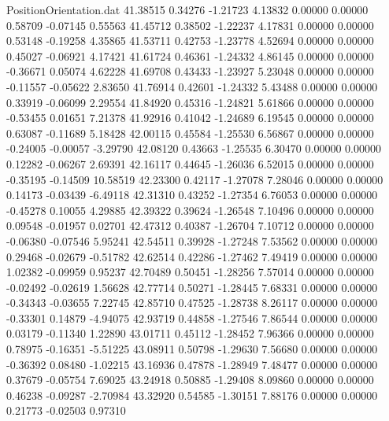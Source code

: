 \begin{filecontents}{PositionOrientation.dat}
  41.38515    0.34276   -1.21723     4.13832    0.00000    0.00000    0.58709   -0.07145    0.55563
  41.45712    0.38502   -1.22237     4.17831    0.00000    0.00000    0.53148   -0.19258    4.35865
  41.53711    0.42753   -1.23778     4.52694    0.00000    0.00000    0.45027   -0.06921    4.17421
  41.61724    0.46361   -1.24332     4.86145    0.00000    0.00000   -0.36671    0.05074    4.62228
  41.69708    0.43433   -1.23927     5.23048    0.00000    0.00000   -0.11557   -0.05622    2.83650
  41.76914    0.42601   -1.24332     5.43488    0.00000    0.00000    0.33919   -0.06099    2.29554
  41.84920    0.45316   -1.24821     5.61866    0.00000    0.00000   -0.53455    0.01651    7.21378
  41.92916    0.41042   -1.24689     6.19545    0.00000    0.00000    0.63087   -0.11689    5.18428
  42.00115    0.45584   -1.25530     6.56867    0.00000    0.00000   -0.24005   -0.00057   -3.29790
  42.08120    0.43663   -1.25535     6.30470    0.00000    0.00000    0.12282   -0.06267    2.69391
  42.16117    0.44645   -1.26036     6.52015    0.00000    0.00000   -0.35195   -0.14509   10.58519
  42.23300    0.42117   -1.27078     7.28046    0.00000    0.00000    0.14173   -0.03439   -6.49118
  42.31310    0.43252   -1.27354     6.76053    0.00000    0.00000   -0.45278    0.10055    4.29885
  42.39322    0.39624   -1.26548     7.10496    0.00000    0.00000    0.09548   -0.01957    0.02701
  42.47312    0.40387   -1.26704     7.10712    0.00000    0.00000   -0.06380   -0.07546    5.95241
  42.54511    0.39928   -1.27248     7.53562    0.00000    0.00000    0.29468   -0.02679   -0.51782
  42.62514    0.42286   -1.27462     7.49419    0.00000    0.00000    1.02382   -0.09959    0.95237
  42.70489    0.50451   -1.28256     7.57014    0.00000    0.00000   -0.02492   -0.02619    1.56628
  42.77714    0.50271   -1.28445     7.68331    0.00000    0.00000   -0.34343   -0.03655    7.22745
  42.85710    0.47525   -1.28738     8.26117    0.00000    0.00000   -0.33301    0.14879   -4.94075
  42.93719    0.44858   -1.27546     7.86544    0.00000    0.00000    0.03179   -0.11340    1.22890
  43.01711    0.45112   -1.28452     7.96366    0.00000    0.00000    0.78975   -0.16351   -5.51225
  43.08911    0.50798   -1.29630     7.56680    0.00000    0.00000   -0.36392    0.08480   -1.02215
  43.16936    0.47878   -1.28949     7.48477    0.00000    0.00000    0.37679   -0.05754    7.69025
  43.24918    0.50885   -1.29408     8.09860    0.00000    0.00000    0.46238   -0.09287   -2.70984
  43.32920    0.54585   -1.30151     7.88176    0.00000    0.00000    0.21773   -0.02503    0.97310

\end{filecontents}
